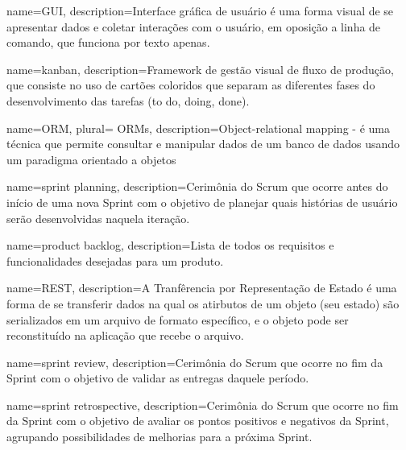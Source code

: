  {
    name=GUI,
    description={Interface gráfica de usuário é uma forma visual de se
    apresentar dados e coletar interações com o usuário, em oposição a
    linha de comando, que funciona por texto apenas.}
}

 {
    name=kanban,
    description={Framework de gestão visual de fluxo de produção, que consiste no uso de cartões coloridos que separam as diferentes fases do desenvolvimento das tarefas (to do, doing, done).}
}


 {
    name=ORM,
    plural= {ORMs},
    description={Object-relational mapping - é uma técnica que permite consultar 	e manipular dados de um banco de dados usando um paradigma orientado a 				objetos}
}

 {
    name={sprint planning},
    description={Cerimônia do Scrum que ocorre antes do início
    de uma nova Sprint com o objetivo de planejar quais histórias
    de usuário serão desenvolvidas naquela iteração.}
}

 {
    name={product backlog},
    description={Lista de todos os requisitos e funcionalidades desejadas para um produto.}
}


 {
    name=REST,
    description={A Tranfêrencia por Representação de Estado é uma forma
    de se transferir dados na qual os atirbutos de um objeto (seu
    estado) são serializados em um arquivo de formato específico, e
    o objeto pode ser reconstituído na aplicação que recebe o arquivo.}
}

 {
    name={sprint review},
    description={Cerimônia do Scrum que ocorre no fim da Sprint
    com o objetivo de validar as entregas daquele período.}
}

 {
    name={sprint retrospective},
    description={Cerimônia do Scrum que ocorre no fim da Sprint com
    o objetivo de avaliar os pontos positivos e negativos
    da Sprint, agrupando possibilidades de melhorias
    para a próxima Sprint.}
}

